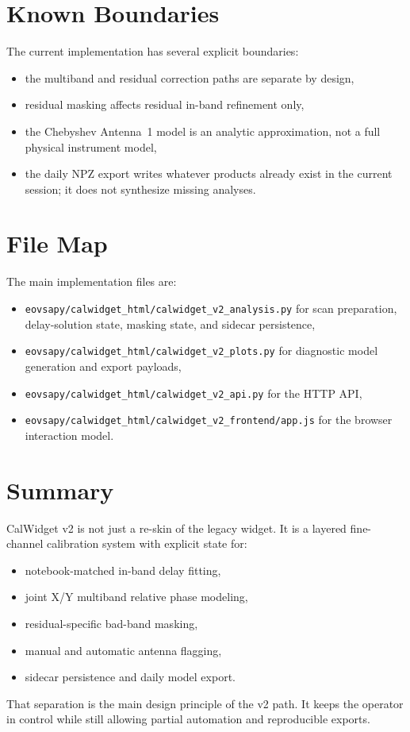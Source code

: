 \documentclass[11pt]{article}
\begin{document}
\section{Known Boundaries}

The current implementation has several explicit boundaries:
\begin{itemize}[leftmargin=1.5em]
  \item the multiband and residual correction paths are separate by design,
  \item residual masking affects residual in-band refinement only,
  \item the Chebyshev Antenna~1 model is an analytic approximation, not a full
  physical instrument model,
  \item the daily NPZ export writes whatever products already exist in the
  current session; it does not synthesize missing analyses.
\end{itemize}

\section{File Map}

The main implementation files are:
\begin{itemize}[leftmargin=1.5em]
  \item \texttt{eovsapy/calwidget\_html/calwidget\_v2\_analysis.py} for scan
  preparation, delay-solution state, masking state, and sidecar persistence,
  \item \texttt{eovsapy/calwidget\_html/calwidget\_v2\_plots.py} for diagnostic
  model generation and export payloads,
  \item \texttt{eovsapy/calwidget\_html/calwidget\_v2\_api.py} for the HTTP API,
  \item \texttt{eovsapy/calwidget\_html/calwidget\_v2\_frontend/app.js} for the
  browser interaction model.
\end{itemize}

\section{Summary}

CalWidget v2 is not just a re-skin of the legacy widget. It is a layered
fine-channel calibration system with explicit state for:
\begin{itemize}[leftmargin=1.5em]
  \item notebook-matched in-band delay fitting,
  \item joint X/Y multiband relative phase modeling,
  \item residual-specific bad-band masking,
  \item manual and automatic antenna flagging,
  \item sidecar persistence and daily model export.
\end{itemize}

That separation is the main design principle of the v2 path. It keeps the
operator in control while still allowing partial automation and reproducible
exports.
\end{document}
